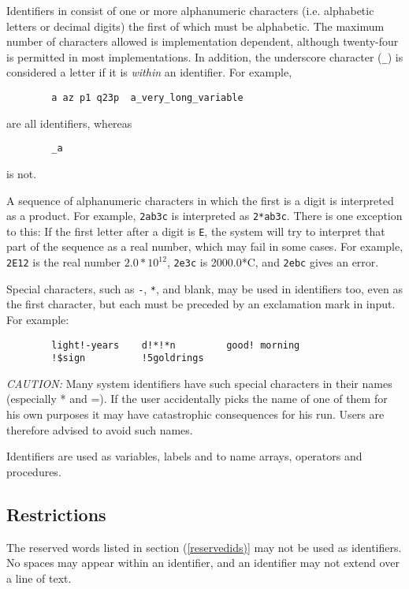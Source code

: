 Identifiers in {\REDUCE} consist of one or more
alphanumeric characters (i.e. alphabetic letters or decimal
digits) the first of which must be alphabetic.  The maximum number of
characters allowed is implementation dependent, although twenty-four is
permitted in most implementations.  In addition, the underscore character
(\texttt{\_}) is considered a letter if it is \emph{within} an identifier.
For example,
\begin{verbatim}
        a az p1 q23p  a_very_long_variable
\end{verbatim}
are all identifiers, whereas
\begin{verbatim}
        _a
\end{verbatim}
is not.

A sequence of alphanumeric characters in which the first is a digit is
interpreted as a product.  For example, \texttt{2ab3c} is interpreted as
\texttt{2*ab3c}.  There is one exception to this:  If the first letter after a
digit is \texttt{E}, the system will try to interpret that part of the
sequence as a real number, which may fail in some cases.  For
example, \texttt{2E12} is the real number $2.0*10^{12}$, \texttt{2e3c} is
2000.0*C, and \texttt{2ebc} gives an error.

Special characters, such as \texttt{-}, \texttt{*}, and blank, may be
used in identifiers
too, even as the first character, but each must be preceded by an
exclamation mark in input.  For example:
\begin{verbatim}
        light!-years    d!*!*n         good! morning
        !$sign          !5goldrings
\end{verbatim}
\textit{CAUTION:} Many system identifiers have such special characters in their
names (especially * and =). If the user accidentally picks the name of one
of them for his own purposes it may have catastrophic consequences for his
{\REDUCE} run.  Users are therefore advised to avoid such names.

Identifiers are used as variables, labels and to name arrays, operators
and procedures.

\subsection*{Restrictions}

The reserved words listed in section (\ref{reservedids)} may not be used as
identifiers.  No spaces may appear within an identifier, and an identifier
may not extend over a line of text.

